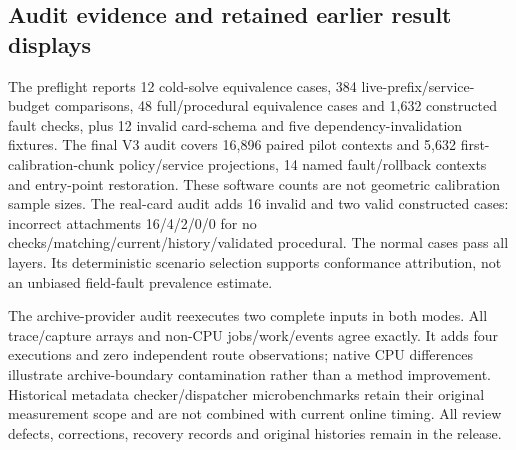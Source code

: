 \subsection{Audit evidence and retained earlier result displays}
The preflight reports 12 cold-solve equivalence cases, 384 live-prefix/service-budget comparisons, 48 full/procedural equivalence cases and 1,632 constructed fault checks, plus 12 invalid card-schema and five dependency-invalidation fixtures. The final V3 audit covers 16,896 paired pilot contexts and 5,632 first-calibration-chunk policy/service projections, 14 named fault/rollback contexts and entry-point restoration. These software counts are not geometric calibration sample sizes. The real-card audit adds 16 invalid and two valid constructed cases: incorrect attachments 16/4/2/0/0 for no checks/matching/current/history/validated procedural. The normal cases pass all layers. Its deterministic scenario selection supports conformance attribution, not an unbiased field-fault prevalence estimate.

The archive-provider audit reexecutes two complete inputs in both modes. All trace/capture arrays and non-CPU jobs/work/events agree exactly. It adds four executions and zero independent route observations; native CPU differences illustrate archive-boundary contamination rather than a method improvement. Historical metadata checker/dispatcher microbenchmarks retain their original measurement scope and are not combined with current online timing. All review defects, corrections, recovery records and original histories remain in the release.

